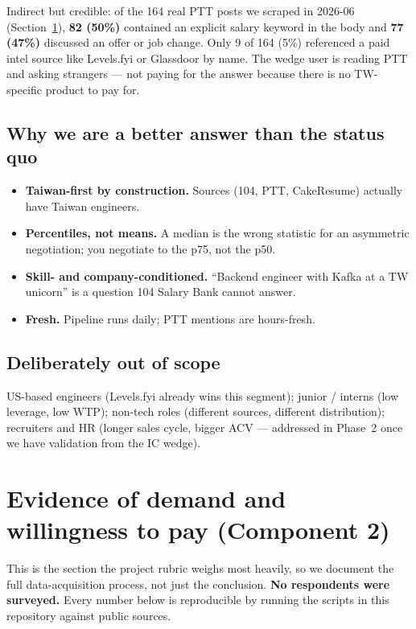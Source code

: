 \documentclass[11pt,a4paper]{article}
\begin{document}
Indirect but credible: of the 164 real PTT posts we scraped in
2026-06 (Section~\ref{sec:evidence}), \textbf{82 (50\%)} contained an
explicit salary keyword in the body and \textbf{77 (47\%)} discussed
an offer or job change. Only 9 of 164 (5\%) referenced a paid intel
source like Levels.fyi or Glassdoor by name. The wedge user is reading
PTT and asking strangers --- not paying for the answer because there
is no TW-specific product to pay for.

\subsection*{Why we are a better answer than the status quo}
\begin{itemize}[leftmargin=*,itemsep=0.1em,topsep=0.2em]
  \item \textbf{Taiwan-first by construction.} Sources (104, PTT,
    CakeResume) actually have Taiwan engineers.
  \item \textbf{Percentiles, not means.} A median is the wrong statistic
    for an asymmetric negotiation; you negotiate to the p75, not the p50.
  \item \textbf{Skill- and company-conditioned.} ``Backend engineer with
    Kafka at a TW unicorn'' is a question 104 Salary Bank cannot answer.
  \item \textbf{Fresh.} Pipeline runs daily; PTT mentions are hours-fresh.
\end{itemize}

\subsection*{Deliberately out of scope}
US-based engineers (Levels.fyi already wins this segment); junior / interns
(low leverage, low WTP); non-tech roles (different sources, different
distribution); recruiters and HR (longer sales cycle, bigger ACV ---
addressed in Phase~2 once we have validation from the IC wedge).

\section{Evidence of demand and willingness to pay (Component 2)}
\label{sec:evidence}

This is the section the project rubric weighs most heavily, so we
document the full data-acquisition process, not just the conclusion.
\textbf{No respondents were surveyed.} Every number below is reproducible
by running the scripts in this repository against public sources.
\end{document}
